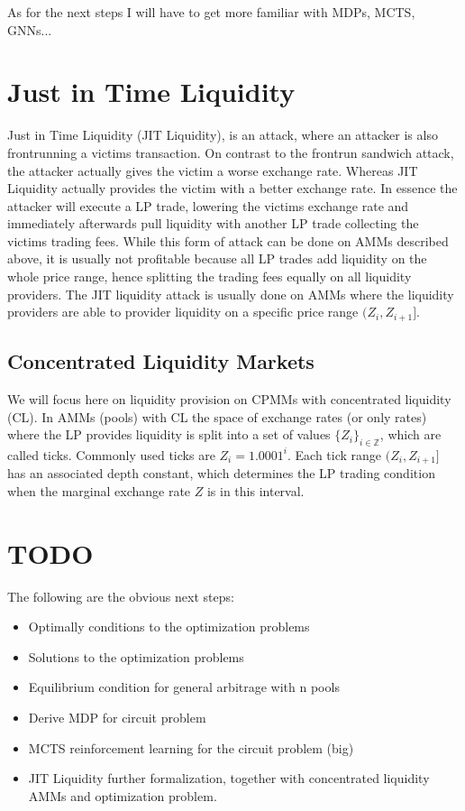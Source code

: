 As for the next steps I will have to get more familiar with MDPs, MCTS, GNNs...

\section{Just in Time Liquidity}
Just in Time Liquidity (JIT Liquidity), is an attack, where an attacker is
also frontrunning a victims transaction. On contrast to the frontrun sandwich
attack, the attacker actually gives the victim a worse exchange rate. Whereas
JIT Liquidity actually provides the victim with a better exchange rate. In
essence the attacker will execute a LP trade, lowering the victims exchange
rate and immediately afterwards pull liquidity with another LP trade
collecting the victims trading fees. While this form of attack can be done on
AMMs described above, it is usually not profitable because all LP trades add
liquidity on the whole price range, hence splitting the trading fees equally
on all liquidity providers. The JIT liquidity attack is usually done on AMMs
where the liquidity providers are able to provider liquidity on a specific
price range $(Z_{i}, Z_{i+1}]$.
\subsection{Concentrated Liquidity Markets}
We will focus here on liquidity provision on CPMMs with concentrated
liquidity (CL). In AMMs (pools) with CL the space of exchange rates (or only
rates) where the LP provides liquidity is split into a set of values
$\{Z_i\}_{i \in \mathbb{Z}}$, which are called ticks. Commonly used ticks are
$Z_i = 1.0001^{i}$. Each tick range $(Z_i, Z_{i+1}]$ has an associated depth
constant, which determines the LP trading condition when the marginal
exchange rate $Z$ is in this interval.

\section{TODO}
The following are the obvious next steps:
\begin{itemize}
    \item Optimally conditions to the optimization problems
    \item Solutions to the optimization problems
    \item Equilibrium condition for general arbitrage with n pools
    \item Derive MDP for circuit problem
    \item MCTS reinforcement learning for the circuit problem (big)
    \item JIT Liquidity further formalization, together with concentrated
        liquidity AMMs and optimization problem.
\end{itemize}


